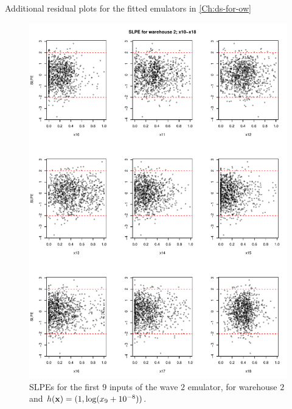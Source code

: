 \begin{chapter}{Additional residual plots  for the fitted emulators in \cref{Ch:ds-for-ow} \label{App:resid}}
\begin{figure}
  \centering
  \includegraphics[width=\textwidth]{fig-app-ds/w1-w2-mean2.pdf}
  \caption{SLPEs for the first $9$ inputs of the wave $2$ emulator, for warehouse $2$ and $h(\mathbf{x}) = (1, \log (x_9 + 10^{-8}))$.}
\end{figure}
\begin{figure}
  \centering

\end{figure}
\end{chapter}
